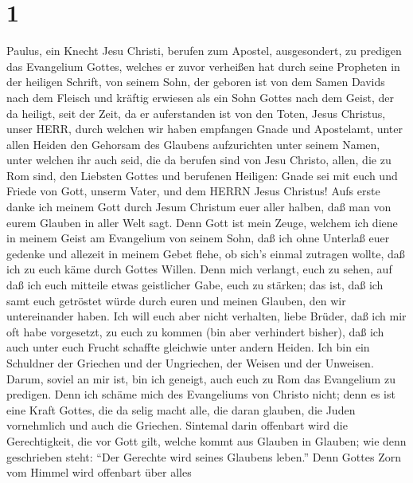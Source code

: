 \hypertarget{section}{%
\section{1}\label{section}}

 Paulus, ein Knecht Jesu Christi, berufen zum Apostel,
ausgesondert, zu predigen das Evangelium Gottes,  welches er
zuvor verheißen hat durch seine Propheten in der heiligen Schrift,
 von seinem Sohn, der geboren ist von dem Samen Davids nach
dem Fleisch  und kräftig erwiesen als ein Sohn Gottes nach
dem Geist, der da heiligt, seit der Zeit, da er auferstanden ist von den
Toten, Jesus Christus, unser HERR,  durch welchen wir haben
empfangen Gnade und Apostelamt, unter allen Heiden den Gehorsam des
Glaubens aufzurichten unter seinem Namen,  unter welchen ihr
auch seid, die da berufen sind von Jesu Christo,  allen, die
zu Rom sind, den Liebsten Gottes und berufenen Heiligen: Gnade sei mit
euch und Friede von Gott, unserm Vater, und dem HERRN Jesus Christus!
 Aufs erste danke ich meinem Gott durch Jesum Christum euer
aller halben, daß man von eurem Glauben in aller Welt sagt. 
Denn Gott ist mein Zeuge, welchem ich diene in meinem Geist am
Evangelium von seinem Sohn, daß ich ohne Unterlaß euer gedenke
 und allezeit in meinem Gebet flehe, ob sich's einmal
zutragen wollte, daß ich zu euch käme durch Gottes Willen. 
Denn mich verlangt, euch zu sehen, auf daß ich euch mitteile etwas
geistlicher Gabe, euch zu stärken;  das ist, daß ich samt
euch getröstet würde durch euren und meinen Glauben, den wir
untereinander haben.  Ich will euch aber nicht verhalten,
liebe Brüder, daß ich mir oft habe vorgesetzt, zu euch zu kommen (bin
aber verhindert bisher), daß ich auch unter euch Frucht schaffte
gleichwie unter andern Heiden.  Ich bin ein Schuldner der
Griechen und der Ungriechen, der Weisen und der Unweisen. 
Darum, soviel an mir ist, bin ich geneigt, auch euch zu Rom das
Evangelium zu predigen.  Denn ich schäme mich des
Evangeliums von Christo nicht; denn es ist eine Kraft Gottes, die da
selig macht alle, die daran glauben, die Juden vornehmlich und auch die
Griechen.  Sintemal darin offenbart wird die Gerechtigkeit,
die vor Gott gilt, welche kommt aus Glauben in Glauben; wie denn
geschrieben steht: ``Der Gerechte wird seines Glaubens leben.''
 Denn Gottes Zorn vom Himmel wird offenbart über alles
